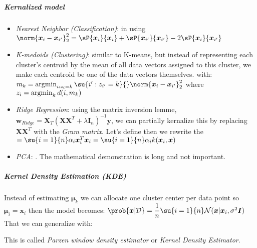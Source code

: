 \subparagraph{Kernalized model}
\begin{itemize}
    \item \emph{Nearest Neighbor (Classification)}: in using $\norm{\bm{x}_{i}
        -\bm{x}_{i'}}^{2}_{2} = \sP{\bm{x}_{i}}{\bm{x}_{i}}  +
        \sP{\bm{x}_{i'}}{\bm{x}_{i'}} -2\sP{\bm{x}_{i}}{\bm{x}_{i'}}$
    \item \emph{K-medoids (Clustering)}: similar to K-means, but instead of
        representing each cluster's centroid by the mean of all data vectors
        assigned to this cluster, we make each centroid be one of the data 
        vectors themselves.  with: $m_{k} = 
        \argmin_{i:z_{i}=k}\su{i':z_{i'}=k}{}
        \norm{\bm{x}_{i}-\bm{x}_{i'}}^{2}_{2}$ where $z_{i} = \operatorname*{argmin}_{k} 
        d(i,m_{k})$
    \item \emph{Ridge Regression}: using the matrix inversion lemme, $\bm{w}_{
        Ridge} = \bm{X}_{T}\left(\bm{X}\bm{X}^{T}+\lambda\bm{I}_{n}\right)^{
        -1}\bm{y}$, we can partially kernalize this by replacing $\bm{X}
        \bm{X}^{T}$ with the \emph{Gram matrix}. Let's define  then we rewrite the $=\su{i=1}{n}\alpha_{i}\bm{x}_{i}^{T}\bm{x}
        _{i} = \su{i=1}{n}\alpha_{i}k(\bm{x}_{i},\bm{x})$
    \item \emph{PCA}: . The mathematical demonstration is long and not 
        important.
\end{itemize}
\subparagraph{Kernel Density Estimation (KDE)}
Instead of estimating $\bm{\mu}_{k}$ we can allocate one cluster center per data point 
so $\bm{\mu}_{i} = \bm{x}_{i}$ then the model becomes: $\prob{\bm{x}|\mathcal{D}} =
\dfrac{1}{n}\su{i=1}{n}\mathcal{N}(\bm{x}|\bm{x}_{i}, \sigma^{2}\bm{I})$
That we can generalize with:
\begin{center}
\end{center}
This is called \emph{Parzen window density estimator} or \emph{Kernel Density 
Estimator}.\\




